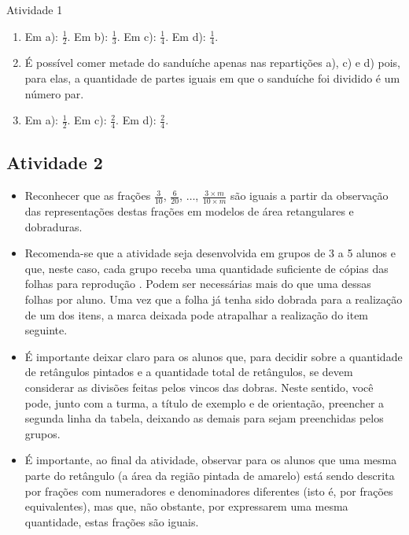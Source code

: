 \begin{multicols}{2}
\begin{resposta*}{Atividade 1}  
\begin{enumerate} [\quad a)] %
    \item       Em a):       $\frac{1}{2}$. Em b):       $\frac{1}{3}$. Em c):   
    $\frac{1}{4}$. Em d):       $\frac{1}{4}$.
    \item       É possível comer metade do sanduíche apenas nas repartições a), 
c) e d) pois, para elas, a quantidade de partes iguais em que o sanduíche foi 
dividido é um número par.
    \item       Em a):       $\frac{1}{2}$. Em c):       $\frac{2}{4}$. Em d):   
    $\frac{2}{4}$.
\end{enumerate} %
  
\end{resposta*}





\subsection{Atividade 2}

\begin{itemize} %
    \item       Reconhecer que as frações       $\frac{3}{10}$,       
$\frac{6}{20}$,       $\ldots$,       $\frac{3 \times m}{10 \times m}$       são 
iguais a partir da observação das representações destas frações em modelos de 
área retangulares e dobraduras. 
\end{itemize} %
  
  
 
\begin{itemize} %
    \item       Recomenda-se que a atividade seja desenvolvida em grupos de 3 a 
5 alunos e que, neste caso, cada grupo receba uma quantidade suficiente de 
cópias das             folhas para reprodução      . Podem ser necessárias mais 
do que uma dessas folhas por aluno. Uma vez que a folha já tenha sido dobrada 
para a realização de um dos itens, a marca deixada pode atrapalhar a realização 
do item seguinte. 
    \item       É importante deixar claro para os alunos que, para decidir sobre 
a quantidade de retângulos pintados e a quantidade total de retângulos, se devem 
considerar as divisões feitas pelos vincos das dobras. Neste sentido, você pode, 
junto com a turma, a título de exemplo e de orientação, preencher a segunda 
linha da tabela, deixando as demais para sejam preenchidas pelos grupos.
    \item       É importante, ao final da atividade, observar para os alunos que 
uma mesma parte do retângulo (a área da região pintada de amarelo) está sendo 
descrita por frações com numeradores e denominadores diferentes (isto é, por 
frações equivalentes), mas que, não obstante, por expressarem uma mesma 
quantidade, estas frações são iguais. 
\end{itemize} %
  

\end{multicols}
